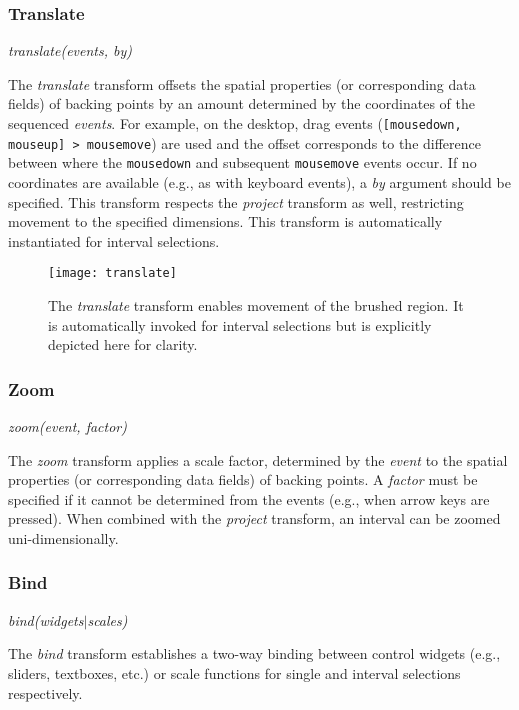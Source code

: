 \subsubsection{Translate}

\centerline{\emph{translate(events, by)}}

The \emph{translate} transform offsets the spatial properties (or corresponding
data fields) of backing points by an amount determined by the coordinates of the
sequenced \emph{events}. For example, on the desktop, drag events
(\texttt{[mousedown, mouseup] > mousemove}) are used and the offset corresponds
to the difference between where the \texttt{mousedown} and subsequent
\texttt{mousemove} events occur. If no coordinates are available (e.g., as with
keyboard events), a \emph{by} argument should be specified. This transform
respects the \emph{project} transform as well, restricting movement to the
specified dimensions. This transform is automatically instantiated for interval
selections.

\begin{figure}[h!]
  \centering
  \texttt{[image: translate]}
  \caption{The \emph{translate} transform enables movement of the brushed
  region. It is automatically invoked for interval selections but is
  explicitly depicted here for clarity.}
  \label{fig:translate}
\end{figure}

\subsubsection{Zoom}

\centerline{\emph{zoom(event, factor)}}

The \emph{zoom} transform applies a scale factor, determined by the \emph{event}
to the spatial properties (or corresponding data fields) of backing points. A
\emph{factor} must be specified if it cannot be determined from the events
(e.g., when arrow keys are pressed). When combined with the \emph{project}
transform, an interval can be zoomed uni-dimensionally.

\subsubsection{Bind}

\centerline{\emph{bind(widgets$|$scales)}}

The \emph{bind} transform establishes a two-way binding between control widgets
(e.g., sliders, textboxes, etc.) or scale functions for single and interval
selections respectively.


